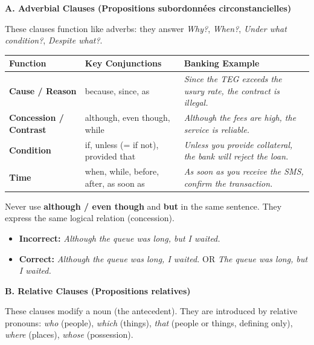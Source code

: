 \documentclass[11pt]{article}
\newcommand{\cle}[1]{{\popxbold\color{popdark}#1}}
\begin{document}
\textbf{A. Adverbial Clauses (Propositions subordonnées circonstancielles)}\par
These clauses function like adverbs: they answer \textit{Why?}, \textit{When?}, \textit{Under what condition?}, \textit{Despite what?}.

\begin{center}
\begin{tabularx}{\linewidth}{|l|X|X|}\hline
\rowcolor{popblueL}
\textbf{Function} & \textbf{Key Conjunctions} & \textbf{Banking Example} \\ \hline
\textbf{Cause / Reason} & \cle{because}, \cle{since}, \cle{as} & \textit{Since the TEG exceeds the usury rate, the contract is illegal.} \\ \hline
\textbf{Concession / Contrast} & \cle{although}, \cle{even though}, \cle{while} & \textit{Although the fees are high, the service is reliable.} \\ \hline
\textbf{Condition} & \cle{if}, \cle{unless} (= if not), \cle{provided that} & \textit{Unless you provide collateral, the bank will reject the loan.} \\ \hline
\textbf{Time} & \cle{when}, \cle{while}, \cle{before}, \cle{after}, \cle{as soon as} & \textit{As soon as you receive the SMS, confirm the transaction.} \\ \hline
\end{tabularx}
\end{center}

\begin{attention}
\cle{Never} use \textbf{although / even though} and \textbf{but} in the same sentence. They express the same logical relation (concession).
\begin{itemize}
    \item \textbf{Incorrect:} \textit{Although the queue was long, but I waited.}
    \item \textbf{Correct:} \textit{Although the queue was long, I waited.} \quad OR \quad \textit{The queue was long, but I waited.}
\end{itemize}
\end{attention}

\textbf{B. Relative Clauses (Propositions relatives)}\par
These clauses modify a noun (the \cle{antecedent}). They are introduced by relative pronouns: \textit{who} (people), \textit{which} (things), \textit{that} (people or things, defining only), \textit{where} (places), \textit{whose} (possession).
\end{document}
